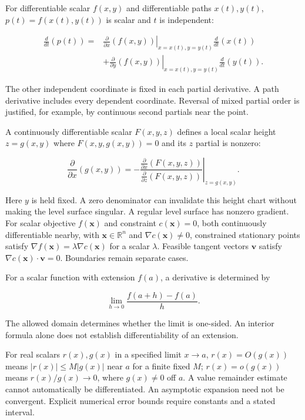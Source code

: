 \documentclass[11pt,oneside,openany]{book}
\begin{document}
\hfill%
\begin{minipage}[t]{0.485\textwidth}\vspace{0pt}

For differentiable scalar \(f(x,y)\) and differentiable paths \(x(t),y(t)\),
\(p(t)=f(x(t),y(t))\) is scalar and \(t\) is independent:

\[
\begin{aligned}
\frac{d}{dt}(p(t))
={}&\left.\frac{\partial}{\partial x}(f(x,y))\right|_{x=x(t),y=y(t)}\frac{d}{dt}(x(t))\\
&+\left.\frac{\partial}{\partial y}(f(x,y))\right|_{x=x(t),y=y(t)}\frac{d}{dt}(y(t)).
\end{aligned}
\]

The other independent coordinate is fixed in each partial derivative.
A path derivative includes every dependent coordinate. Reversal of mixed
partial order is justified, for example, by continuous second partials near the point.


A continuously differentiable scalar \(F(x,y,z)\) defines a local scalar
height \(z=g(x,y)\) where \(F(x,y,g(x,y))=0\) and its \(z\) partial is nonzero:

\[
\frac{\partial}{\partial x}(g(x,y))
=-\left.\frac{\frac{\partial}{\partial x}(F(x,y,z))}
{\frac{\partial}{\partial z}(F(x,y,z))}\right|_{z=g(x,y)}.
\]

Here \(y\) is held fixed. A zero denominator can invalidate this height chart
without making the level surface singular. A regular level surface has nonzero
gradient. For scalar objective \(f(\mathbf x)\) and constraint \(c(\mathbf x)=0\),
both continuously differentiable nearby, with \(\mathbf x\in\mathbb R^n\) and
\(\nabla c(\mathbf x)\ne0\),
constrained stationary points satisfy \(\nabla f(\mathbf x)=\lambda\nabla c(\mathbf x)\) for a scalar
\(\lambda\). Feasible tangent vectors \(\mathbf v\) satisfy
\(\nabla c(\mathbf x)\cdot\mathbf v=0\). Boundaries remain separate cases.


For a scalar function with extension \(f(a)\), a derivative is determined by

\[
\lim_{h\to0}\frac{f(a+h)-f(a)}{h}.
\]

The allowed domain determines whether the limit is one-sided. An interior
formula alone does not establish differentiability of an extension.

For real scalars \(r(x),g(x)\) in a specified limit \(x\to a\),
\(r(x)=O(g(x))\) means \(|r(x)|\le M|g(x)|\) near \(a\) for a finite fixed \(M\);
\(r(x)=o(g(x))\) means \(r(x)/g(x)\to0\), where \(g(x)\ne0\) off \(a\).
A value remainder estimate cannot automatically be differentiated.
An asymptotic expansion need not be convergent. Explicit numerical error
bounds require constants and a stated interval.
\end{minipage}
\end{document}
